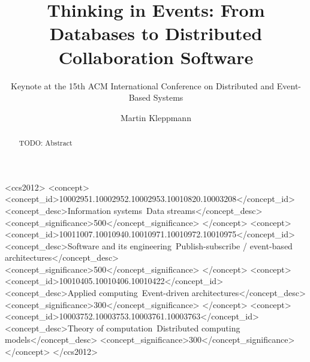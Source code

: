 \documentclass[sigconf,nonacm]{acmart}
\begin{document}
\title{Thinking in Events: From Databases to Distributed Collaboration Software}
\subtitle{Keynote at the 15th ACM International Conference on Distributed and Event-Based Systems}

\author{Martin Kleppmann}

\begin{abstract}
TODO: Abstract
\end{abstract}

\begin{CCSXML}
<ccs2012>
  <concept>
    <concept_id>10002951.10002952.10002953.10010820.10003208</concept_id>
    <concept_desc>Information systems~Data streams</concept_desc>
    <concept_significance>500</concept_significance>
  </concept>
  <concept>
    <concept_id>10011007.10010940.10010971.10010972.10010975</concept_id>
    <concept_desc>Software and its engineering~Publish-subscribe / event-based architectures</concept_desc>
    <concept_significance>500</concept_significance>
  </concept>
  <concept>
    <concept_id>10010405.10010406.10010422</concept_id>
    <concept_desc>Applied computing~Event-driven architectures</concept_desc>
    <concept_significance>300</concept_significance>
  </concept>
  <concept>
    <concept_id>10003752.10003753.10003761.10003763</concept_id>
    <concept_desc>Theory of computation~Distributed computing models</concept_desc>
    <concept_significance>300</concept_significance>
  </concept>
</ccs2012>
\end{CCSXML}


\maketitle

\def\figureautorefname{Figure}
\def\sectionautorefname{Section}
\def\subsectionautorefname{Section}
\def\subsubsectionautorefname{Section}


\end{document}
